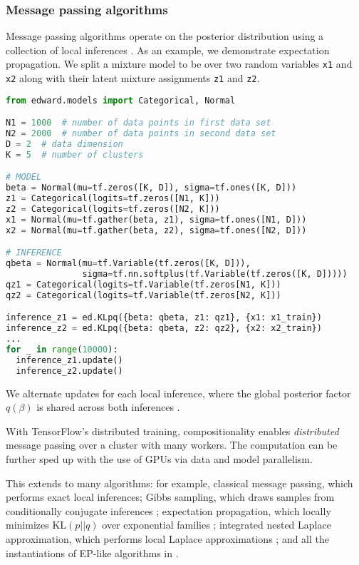 \subsubsection{Message passing algorithms}

Message passing algorithms operate on the posterior distribution using
a collection of local inferences \citep{koller2009probabilistic}.
As an example, we demonstrate expectation propagation. We split a
mixture model to be over two random variables \texttt{x1} and
\texttt{x2} along with their latent mixture assignments \texttt{z1}
and \texttt{z2}.

\begin{lstlisting}[language=Python]
from edward.models import Categorical, Normal

N1 = 1000  # number of data points in first data set
N2 = 2000  # number of data points in second data set
D = 2  # data dimension
K = 5  # number of clusters

# MODEL
beta = Normal(mu=tf.zeros([K, D]), sigma=tf.ones([K, D]))
z1 = Categorical(logits=tf.zeros([N1, K]))
z2 = Categorical(logits=tf.zeros([N2, K]))
x1 = Normal(mu=tf.gather(beta, z1), sigma=tf.ones([N1, D]))
x2 = Normal(mu=tf.gather(beta, z2), sigma=tf.ones([N2, D]))

# INFERENCE
qbeta = Normal(mu=tf.Variable(tf.zeros([K, D])),
               sigma=tf.nn.softplus(tf.Variable(tf.zeros([K, D]))))
qz1 = Categorical(logits=tf.Variable(tf.zeros[N1, K]))
qz2 = Categorical(logits=tf.Variable(tf.zeros[N2, K]))

inference_z1 = ed.KLpq({beta: qbeta, z1: qz1}, {x1: x1_train})
inference_z2 = ed.KLpq({beta: qbeta, z2: qz2}, {x2: x2_train})
...
for _ in range(10000):
  inference_z1.update()
  inference_z2.update()
\end{lstlisting}

We alternate updates for each local inference, where the global
posterior factor $q(\beta)$ is shared across both inferences
\citep{gelman2014expectation}.

With TensorFlow's distributed training, compositionality
enables \emph{distributed} message passing over a cluster with many
workers. The computation can be further sped up with the use of GPUs
via data and model parallelism.

This extends to many algorithms: for example,
classical message passing, which performs exact local inferences;
Gibbs sampling, which draws samples from conditionally conjugate
inferences \citep{geman1984stochastic};
expectation propagation, which locally minimizes
$\text{KL}(p || q)$ over exponential families \citep{minka2001expectation};
integrated nested Laplace
approximation, which performs local Laplace approximations
\citep{rue2009approximate};
and
all the instantiations of EP-like algorithms in
\citet{gelman2014expectation}.

